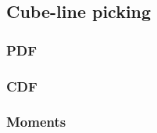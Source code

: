 \subsection{Cube-line picking}
\label{sec:cube_line}


\subsubsection{PDF}


\subsubsection{CDF}


\subsubsection{Moments}
